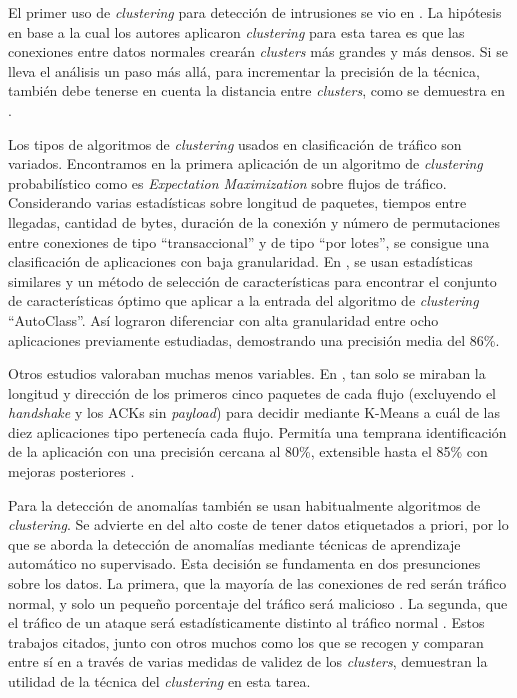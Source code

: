 El primer uso de \emph{clustering} para detección de intrusiones se vio en \cite{Portnoy_2000}.
La hipótesis en base a la cual los autores aplicaron \emph{clustering} para esta tarea es que las conexiones entre datos normales crearán \emph{clusters} más grandes y más densos.
Si se lleva el análisis un paso más allá, para incrementar la precisión de la técnica, también debe tenerse en cuenta la distancia entre \emph{clusters}, como se demuestra en \cite{JSW+06}.

Los tipos de algoritmos de \emph{clustering} usados en clasificación de tráfico son variados.
Encontramos en \cite{MHL+04} la primera aplicación de un algoritmo de \emph{clustering} probabilístico como es \emph{Expectation Maximization} sobre flujos de tráfico.
Considerando varias estadísticas sobre longitud de paquetes, tiempos entre llegadas, cantidad de bytes, duración de la conexión y
número de permutaciones entre conexiones de tipo ``transaccional'' y de tipo ``por lotes'', se consigue una clasificación de aplicaciones con baja granularidad.
En \cite{ZNA05}, se usan estadísticas similares y un método de selección de características para encontrar el conjunto de características óptimo
que aplicar a la entrada del algoritmo de \emph{clustering} ``AutoClass''.
Así lograron diferenciar con alta granularidad entre ocho aplicaciones previamente estudiadas, demostrando una precisión media del 86\%.

Otros estudios valoraban muchas menos variables.
En \cite{BTA+06}, tan solo se miraban la longitud y dirección de los primeros cinco paquetes de cada flujo (excluyendo el \emph{handshake} y los ACKs sin \emph{payload})
para decidir mediante K-Means a cuál de las diez aplicaciones tipo pertenecía cada flujo.
Permitía una temprana identificación de la aplicación con una precisión cercana al 80\%, extensible hasta el 85\% con mejoras posteriores \cite{BTS06} \cite{BT07}.

Para la detección de anomalías también se usan habitualmente algoritmos de \emph{clustering}.
Se advierte en \cite{Leung_2005} del alto coste de tener datos etiquetados a priori,
por lo que se aborda la detección de anomalías mediante técnicas de aprendizaje automático no supervisado.
Esta decisión se fundamenta en dos presunciones sobre los datos.
La primera, que la mayoría de las conexiones de red serán tráfico normal, y solo un pequeño porcentaje del tráfico será malicioso \cite{Portnoy_2000}.
La segunda, que el tráfico de un ataque será estadísticamente distinto al tráfico normal \cite{Javitz_1993}.
Estos trabajos citados, junto con otros muchos como los que se recogen y comparan entre sí en \cite{Bhuyan_2014} a través de varias medidas de validez de los \emph{clusters},
demuestran la utilidad de la técnica del \emph{clustering} en esta tarea.

